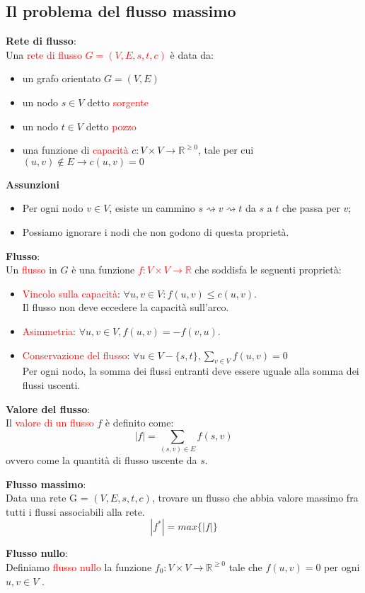 \documentclass[../cheatSheetAlgoritmi.tex]{subfiles}
\begin{document}
\subsection{Il problema del flusso massimo}
\textbf{Rete di flusso}:\\
Una \textcolor{red}{rete di flusso $G = (V, E, s, t, c)$} è data da:
\begin{itemize}
	\item un grafo orientato $G = (V, E)$
	\item un nodo $s \in V$ detto \textcolor{red}{sorgente}
	\item un nodo $t \in V$ detto \textcolor{red}{pozzo}
	\item una funzione di \textcolor{red}{capacità} $c : V \times V \rightarrow \mathbb{R}^{\geq 0}$, tale per cui $(u, v) \notin E \rightarrow c(u, v) = 0$
\end{itemize}
\textbf{Assunzioni}
\begin{itemize}
	\item Per ogni nodo $v \in V$, esiste un cammino $s \rightsquigarrow v \rightsquigarrow t$ da $s$ a $t$ che passa per $v$;
	\item Possiamo ignorare i nodi che non godono di questa proprietà.
\end{itemize}
\textbf{Flusso}: \\
Un \textcolor{red}{flusso} in $G$ è una funzione \textcolor{red}{$f: V \times V \rightarrow \mathbb{R}$} che soddisfa le seguenti proprietà:
\begin{itemize}
	\item \textcolor{red}{Vincolo sulla capacità}: $\forall u, v \in V : f(u, v) \leq c(u,v)$.\\ Il flusso non deve eccedere la capacità sull'arco.
	\item \textcolor{red}{Asimmetria}: $\forall u, v \in V, f(u,v) = - f(v, u)$. 
	\item \textcolor{red}{Conservazione del flusso}: $\forall u \in V - \{s, t\}, \sum_{v \in V} f(u, v) = 0$ 	\\
	Per ogni nodo, la somma dei flussi entranti deve essere uguale alla somma dei flussi uscenti.
\end{itemize}
\textbf{Valore del flusso}:\\
Il \textcolor{red}{valore di un flusso} $f$ è definito come: 
\begin{equation*}
  	|f| = \sum_{(s, v) \in E} f(s, v)
\end{equation*}
ovvero come la quantità di flusso uscente da $s$.
\newpage
\begin{flushleft}
\textbf{Flusso massimo}:\\
Data una rete G = $(V, E, s, t, c)$, trovare un flusso che abbia valore massimo fra tutti i flussi associabili alla rete.
\begin{equation*}
	|f^{*}| = max\{|f|\}
\end{equation*}
\end{flushleft}
\textbf{Flusso nullo}:\\
Definiamo \textcolor{red}{flusso nullo} la funzione $f_{0} : V \times V \rightarrow \mathbb{R}^{\geq 0}$ tale che $f(u, v) = 0$ per ogni $u, v \in V$ .
\end{document}
